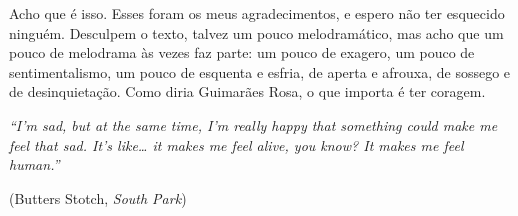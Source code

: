 \begin{otherlanguage}{brazilian}
Acho que é isso. Esses foram os meus agradecimentos, e espero não ter esquecido ninguém. Desculpem o texto, talvez um pouco melodramático, mas acho que um pouco de melodrama às vezes faz parte: um pouco de exagero, um pouco de sentimentalismo, um pouco de esquenta e esfria, de aperta e afrouxa, de sossego e de desinquietação. Como diria Guimarães Rosa, o que importa é ter coragem.

\vspace{1cm}
\begin{flushright}\begin{minipage}{0.85\textwidth}\raggedleft
\foreignlanguage{english}{\itshape ``I'm sad, but at the same time, I'm really happy that something could make me feel that sad. It's like\ldots{} it makes me feel alive, you know? It makes me feel human.''}\par
(Butters Stotch, \emph{South Park})
\end{minipage}\end{flushright}
\end{otherlanguage}
\clearpage
